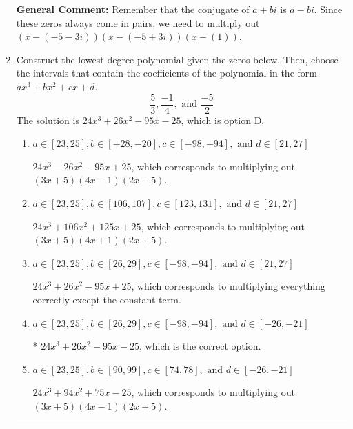 \documentclass{extbook}[14pt]
\newcommand{\litem}[1]{\item #1

\rule{\textwidth}{0.4pt}}
\begin{document}
\begin{enumerate}
{\textbf{General Comment:} Remember that the conjugate of $a+bi$ is $a-bi$. Since these zeros always come in pairs, we need to multiply out $(x-(-5 - 3 i))(x-(-5 + 3 i))(x-(1))$.
}
\litem{
Construct the lowest-degree polynomial given the zeros below. Then, choose the intervals that contain the coefficients of the polynomial in the form $ax^3+bx^2+cx+d$.
\[ \frac{5}{3}, \frac{-1}{4}, \text{ and } \frac{-5}{2} \]The solution is \( 24x^{3} +26 x^{2} -95 x -25 \), which is option D.\begin{enumerate}[label=\Alph*.]
\item \( a \in [23, 25], b \in [-28, -20], c \in [-98, -94], \text{ and } d \in [21, 27] \)

$24x^{3} -26 x^{2} -95 x + 25$, which corresponds to multiplying out $(3x + 5)(4x -1)(2x -5)$.
\item \( a \in [23, 25], b \in [106, 107], c \in [123, 131], \text{ and } d \in [21, 27] \)

$24x^{3} +106 x^{2} +125 x + 25$, which corresponds to multiplying out $(3x + 5)(4x + 1)(2x + 5)$.
\item \( a \in [23, 25], b \in [26, 29], c \in [-98, -94], \text{ and } d \in [21, 27] \)

$24x^{3} +26 x^{2} -95 x + 25$, which corresponds to multiplying everything correctly except the constant term.
\item \( a \in [23, 25], b \in [26, 29], c \in [-98, -94], \text{ and } d \in [-26, -21] \)

* $24x^{3} +26 x^{2} -95 x -25$, which is the correct option.
\item \( a \in [23, 25], b \in [90, 99], c \in [74, 78], \text{ and } d \in [-26, -21] \)

$24x^{3} +94 x^{2} +75 x -25$, which corresponds to multiplying out $(3x + 5)(4x -1)(2x + 5)$.
\end{enumerate}

}
\end{enumerate}
\end{document}
